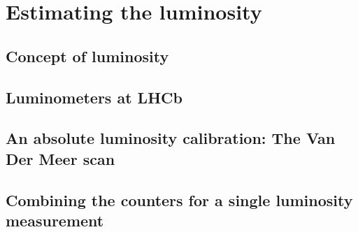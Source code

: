 \chapter{Estimating the luminosity}
\section{Concept of luminosity}
\section{Luminometers at LHCb}
\section{An absolute luminosity calibration: The Van Der Meer scan}
\section{Combining the counters for a single luminosity measurement}